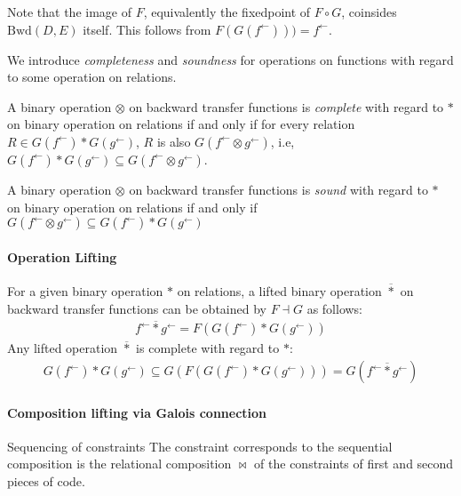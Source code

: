 \documentclass{llncs}
\newcommand{\Unidir}{\mathrm{Bwd}}
\newcommand{\fb}{{f^{\leftarrow}}}
\newcommand{\gb}{{g^{\leftarrow}}}
\newcommand{\comp}{\circ}
\newcommand{\starlift}{\mathbin{\overline{*}}}
\begin{document}
  Note that the image of $F$, equivalently the fixedpoint of $F \comp G$, coinsides $\Unidir(D , E)$ itself. This follows from $F (G (\fb))) = \fb$.

  We introduce \emph{completeness} and \emph{soundness} for operations on functions with regard to some operation on relations.
  \begin{definition}[Completeness]
   A binary operation $\otimes$ on backward transfer functions is \emph{complete} with regard to $*$ on binary operation on relations if and only if for every relation $R \in G(\fb) * G(\gb)$, $R$ is also $G (\fb \otimes \gb)$, i.e, $G(\fb) * G(\gb) \subseteq G (\fb \otimes \gb)$.
  \end{definition}

  \begin{definition}[Soundness]
  A binary operation $\otimes$ on backward transfer functions is \emph{sound} with regard to $*$ on binary operation on relations if and only if
  $G (\fb \otimes \gb) \subseteq G(\fb) * G(\gb)$
  \end{definition}

  \paragraph{Operation Lifting}
  For a given binary operation $*$ on relations, a lifted binary operation $\starlift$ on backward transfer functions can be obtained by $F \dashv G$ as follows:
  \begin{align*}
  \fb \starlift \gb = F (G(\fb) * G(\gb))
  \end{align*}
  Any lifted operation $\starlift$ is complete with regard to $*$:
  \begin{align*}
  G(\fb) * G(\gb) \subseteq G(F(G(\fb) * G(\gb))) = G(\fb \starlift \gb)
  \end{align*}


\paragraph{Composition lifting via Galois connection}


  Sequencing of constraints
    The constraint corresponds to the sequential composition is the relational composition $\bowtie$ of the constraints of first and second pieces of code.
\end{document}
